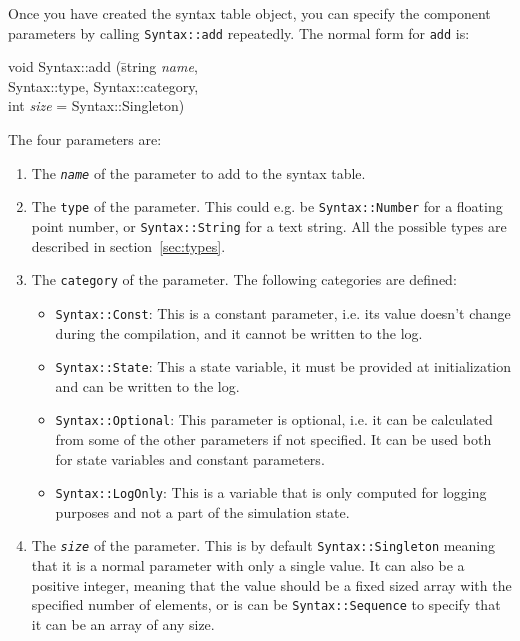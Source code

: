 \documentclass{article}
\newcommand{\code}[1]{\texttt{#1}}
\begin{document}
Once you have created the syntax table object, you can specify the
component parameters by calling \code{Syntax::add} repeatedly.  The
normal form for \code{add} is:
\begin{tt}
  \begin{tabbing}
    void Syntax::add (\=string \textit{name},\\
                     \>Syntax::type, Syntax::category,\\
                     \>int \textit{size} = Syntax::Singleton)
  \end{tabbing}
\end{tt}
The four parameters are:
\begin{enumerate}
\item The \texttt{\emph{name}} of the parameter to add to the syntax
  table. 
\item The \code{type} of the parameter.  This could e.g. be
  \code{Syntax::Number} for a floating point number, or
  \code{Syntax::String} for a text string.  All the possible types are
  described in section~\ref{sec:types}.
\item The \code{category} of the parameter.  The following categories
  are defined:
  \begin{itemize}
  \item \code{Syntax::Const}:
    This is a constant parameter, i.e. its value doesn't change during
    the compilation, and it cannot be written to the log.    
  \item \code{Syntax::State}:
    This a state variable, it must be provided at initialization
    and can be written to the log.
  \item \code{Syntax::Optional}:
    This parameter is optional, i.e. it can be calculated from some of
    the other parameters if not specified.  It can be used both for
    state variables and constant parameters.
  \item \code{Syntax::LogOnly}:
    This is a variable that is only computed for logging purposes
    and not a part of the simulation state. 
  \end{itemize}
\item The \texttt{\textit{size}} of the parameter.  This is by default
  \code{Syntax::Singleton} meaning that it is a normal parameter with
  only a single value.  It can also be a positive integer, meaning
  that the value should be a fixed sized array with the specified
  number of elements, or is can be \code{Syntax::Sequence} to specify
  that it can be an array of any size.
\end{enumerate}
\end{document}

